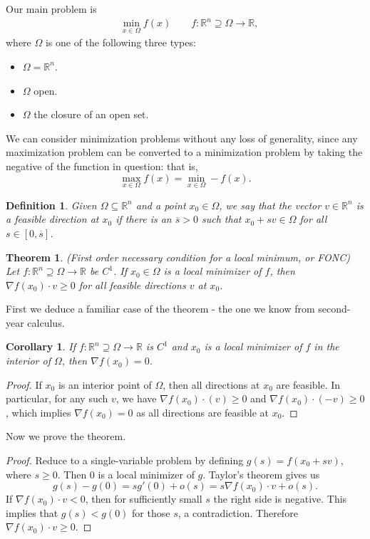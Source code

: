 \documentclass[11pt]{article}
\newcommand{\R}{\mathbb{R}}
\newtheorem{definition}{Definition}[subsection]
\newtheorem{theorem}{Theorem}[subsection]
\newtheorem{corollary}{Corollary}[subsection]
\begin{document}
Our main problem is
\begin{align*}
&\min_{x \in \Omega} f(x) \qquad f : \R^n \supseteq \Omega \to \R,
\end{align*}
where $\Omega$ is one of the following three types:
\begin{itemize}
\item $\Omega = \R^n$.
\item $\Omega$ open.
\item $\Omega$ the closure of an open set.
\end{itemize}
We can consider minimization problems without any loss of generality, since any maximization problem can be converted to a minimization problem by taking the negative of the function in question: that is,
\[
\max_{x \in \Omega} f(x) = \min_{x \in \Omega} -f(x).
\]
\begin{definition}
Given $\Omega \subseteq \R^n$ and a point $x_0 \in \Omega$, we say that the vector $v \in \R^n$ is a feasible direction at $x_0$ if there is an $\overline{s} > 0$ such that $x_0 + sv \in \Omega$ for all $s \in [0, \overline{s}]$.
\end{definition}
\begin{theorem}
(First order necessary condition for a local minimum, or FONC) Let $f : \R^n \supseteq \Omega \to \R$ be $C^1$. If $x_0 \in \Omega$ is a local minimizer of $f$, then $\nabla f(x_0) \cdot v \geq 0$ for all feasible directions $v$ at $x_0$.
\end{theorem}
First we deduce a familiar case of the theorem - the one we know from second-year calculus.
\begin{corollary}
If $f : \R^n \supseteq \Omega \to \R$ is $C^1$ and $x_0$ is a local minimizer of $f$ in the interior of $\Omega$, then $\nabla f(x_0) = 0$.
\end{corollary}
\begin{proof}
If $x_0$ is an interior point of $\Omega$, then all directions at $x_0$ are feasible. In particular, for any such $v$, we have $\nabla f(x_0) \cdot (v) \geq 0$ and $\nabla f(x_0) \cdot (-v) \geq 0$, which implies $\nabla f(x_0) = 0$ as all directions are feasible at $x_0$.
\end{proof}
Now we prove the theorem.
\begin{proof}
Reduce to a single-variable problem by defining $g(s) = f(x_0 + sv)$, where $s \geq 0$. Then $0$ is a local minimizer of $g$. Taylor's theorem gives us
\[
g(s) - g(0) = s g'(0) + o(s) = s \nabla f(x_0) \cdot v + o(s).
\]
If $\nabla f(x_0) \cdot v < 0$, then for sufficiently small $s$ the right side is negative. This implies that $g(s) < g(0)$ for those $s$, a contradiction. Therefore $\nabla f(x_0) \cdot v \geq 0$.
\end{proof}
\end{document}
